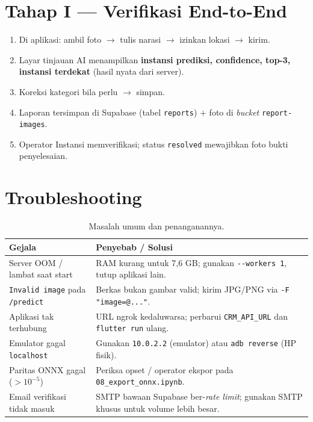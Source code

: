 \documentclass[11pt,a4paper]{article}
\newcommand{\code}[1]{\texttt{\small #1}}
\begin{document}
\section{Tahap I — Verifikasi End-to-End}
\begin{enumerate}[leftmargin=1.6em,itemsep=2pt]
  \item Di aplikasi: ambil foto $\rightarrow$ tulis narasi $\rightarrow$ izinkan lokasi $\rightarrow$ kirim.
  \item Layar tinjauan AI menampilkan \textbf{instansi prediksi, confidence, top-3, instansi terdekat} (hasil nyata dari server).
  \item Koreksi kategori bila perlu $\rightarrow$ simpan.
  \item Laporan tersimpan di Supabase (tabel \code{reports}) + foto di \emph{bucket} \code{report-images}.
  \item Operator Instansi memverifikasi; status \code{resolved} mewajibkan foto bukti penyelesaian.
\end{enumerate}

\section{Troubleshooting}
\begin{table}[h]
\centering
\renewcommand{\arraystretch}{1.3}
\begin{tabular}{@{}p{5.2cm}p{9.0cm}@{}}
\toprule
\textbf{Gejala} & \textbf{Penyebab / Solusi} \\
\midrule
Server OOM / lambat saat start & RAM kurang untuk 7{,}6 GB; gunakan \code{-{}-workers 1}, tutup aplikasi lain. \\
\code{Invalid image} pada \code{/predict} & Berkas bukan gambar valid; kirim JPG/PNG via \code{-F "image=@..."}. \\
Aplikasi tak terhubung & URL ngrok kedaluwarsa; perbarui \code{CRM\_API\_URL} dan \code{flutter run} ulang. \\
Emulator gagal \code{localhost} & Gunakan \code{10.0.2.2} (emulator) atau \code{adb reverse} (HP fisik). \\
Paritas ONNX gagal ($>10^{-5}$) & Periksa opset / operator ekspor pada \code{08\_export\_onnx.ipynb}. \\
Email verifikasi tidak masuk & SMTP bawaan Supabase ber-\emph{rate limit}; gunakan SMTP khusus untuk volume lebih besar. \\
\bottomrule
\end{tabular}
\caption{Masalah umum dan penanganannya.}
\end{table}
\end{document}
